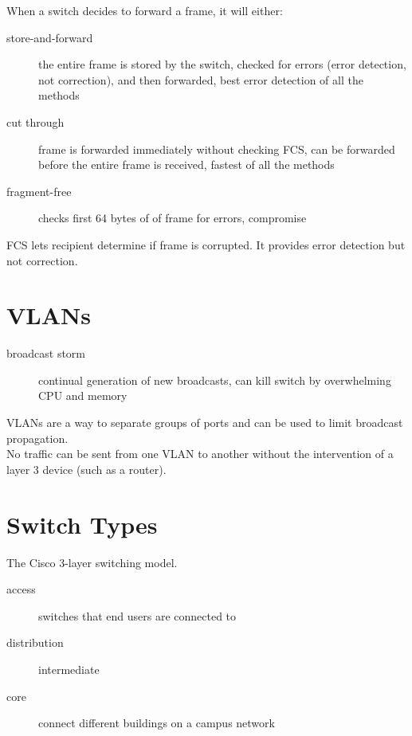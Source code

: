 \documentclass{article}
\begin{document}
When a switch decides to forward a frame, it will either:

\begin{description}

\item[store-and-forward]
the entire frame is stored by the switch, checked for errors (error detection,
not correction), and then forwarded, best error detection of all the methods

\item[cut through]
frame is forwarded immediately without checking FCS, can be forwarded before
the entire frame is received, fastest of all the methods

\item[fragment-free]
checks first 64 bytes of of frame for errors, compromise


\end{description}

FCS lets recipient determine if frame is corrupted. It provides error
detection but not correction.

\section{VLANs}

\begin{description}

\item[broadcast storm]
continual generation of new broadcasts, can kill switch by overwhelming
CPU and memory

\end{description}

VLANs are a way to separate groups of ports and can be used to limit broadcast
propagation.\\

No traffic can be sent from one VLAN to another without the intervention of
a layer 3 device (such as a router).

\section{Switch Types}

The Cisco 3-layer switching model.

\begin{description}

\item[access]
switches that end users are connected to

\item[distribution]
intermediate

\item[core]
connect different buildings on a campus network

\end{description}
\end{document}
